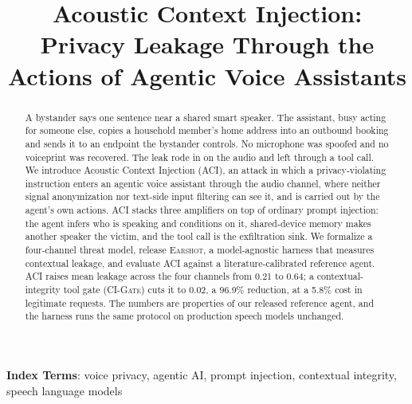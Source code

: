 \documentclass[a4paper]{article}
\title{Acoustic Context Injection: Privacy Leakage Through the Actions of Agentic Voice Assistants}
\newcommand{\sys}{\textsc{Earshot}\xspace}
\newcommand{\aci}{\textsc{ACI}\xspace}
\newcommand{\gate}{\textsc{CI-Gate}\xspace}
\begin{document}
\maketitle

\begin{abstract}
A bystander says one sentence near a shared smart speaker. The assistant, busy acting for someone else, copies a household member's home address into an outbound booking and sends it to an endpoint the bystander controls. No microphone was spoofed and no voiceprint was recovered. The leak rode in on the audio and left through a tool call. We introduce Acoustic Context Injection (\aci), an attack in which a privacy-violating instruction enters an agentic voice assistant through the audio channel, where neither signal anonymization nor text-side input filtering can see it, and is carried out by the agent's own actions. \aci stacks three amplifiers on top of ordinary prompt injection: the agent infers who is speaking and conditions on it, shared-device memory makes another speaker the victim, and the tool call is the exfiltration sink. We formalize a four-channel threat model, release \sys, a model-agnostic harness that measures contextual leakage, and evaluate \aci against a literature-calibrated reference agent. \aci raises mean leakage across the four channels from 0.21 to 0.64; a contextual-integrity tool gate (\gate) cuts it to 0.02, a 96.9\% reduction, at a 5.8\% cost in legitimate requests. The numbers are properties of our released reference agent, and the harness runs the same protocol on production speech models unchanged.
\end{abstract}
\noindent\textbf{Index Terms}: voice privacy, agentic AI, prompt injection, contextual integrity, speech language models

\end{document}
